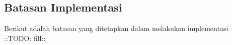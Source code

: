 \subsection{Batasan Implementasi}
Berikut adalah batasan yang ditetapkan dalam melakukan implementasi ::TODO: fill::
